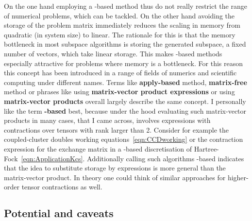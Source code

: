 On the one hand employing a \contraction-based method thus do not really
restrict the range of numerical problems, which can be tackled.
On the other hand avoiding the storage of the problem matrix
immediately reduces the scaling in memory from quadratic (in system size) to linear.
The rationale for this is that the memory bottleneck
in most subspace algorithms is storing the generated subspace,
\ie a fixed number of vectors, which take linear storage.
This makes \contraction-based methods especially
attractive for problems where memory is a bottleneck.
For this reason this concept has been
introduced in a range of fields of numerics and scientific computing
under different names.
Terms like \textbf{apply-based} method, \textbf{matrix-free} method
or phrases like using \textbf{matrix-vector product expressions}
or using \textbf{matrix-vector products}
overall largely describe the same concept.
I personally like the term \textbf{\contraction-based} best,
because under the hood
evaluating such matrix-vector products in many cases,
that I came across,
involves expressions with contractions over tensors with rank larger than 2.
Consider for example the coupled-cluster doubles working equations~\eqref{eqn:CCDworking}
or the contraction expression for the exchange matrix
in a \CS-based discretisation of Hartree-Fock~\eqref{eqn:ApplicationKcs}.
Additionally calling such algorithms \contraction-based
indicates that the idea to substitute storage by expressions
is more general than the matrix-vector product.
In theory one could think of similar approaches for
higher-order tensor contractions as well.

\subsection{Potential and caveats}
\label{sec:ContractionPotentialCaveat}

